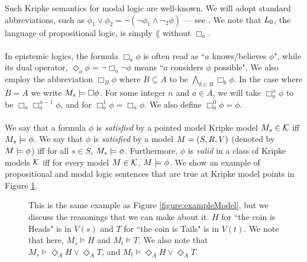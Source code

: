 Such Kripke semantics for modal logic are well-known.
We will adopt standard abbreviations, such as $\phi_1 \lor \phi_2 =
\neg(\neg \phi_1 \land \neg_2 \phi)$ --- see \cite{blackburn2002modal}.
We note that $L_0$, the language of propositional logic, is simply $\lang$ without $\Box_a$.\\
\\
In epistemic logics, the formula $\Box_a \phi$ is often read as ``$a$ knows/believes $\phi$", while
its dual operator, $\Diamond_a \phi = \neg \Box_a \neg \phi$ means ``$a$ considers $\phi$ possible".
We also employ the abbreviation $\Box_B \phi$ where $B \subseteq A$ to be $\bigwedge_{b \in B}
\Box_b \phi$.
In the case where $B = A$ we write $M_s \models \Box \phi$.
For some integer $n$ and $a \in A$, we will take $\Box^n_a \phi$ to be $\Box_a \Box^{n-1}_a \phi$,
and for $\Box^1_a \phi = \Box_a \phi$.
We also define $\Box^0_a \phi = \phi$.\\
\\
We say that a formula $\phi$ is {\em satisfied} by a pointed model Kripke model $M_s \in \mathcal{K}$ iff
$M_s \models \phi$.
We say that $\phi$ is {\em satisfied} by a model $M = (S, R, V)$ (denoted by
    $M \models \phi$) iff
for all $s \in S$, $M_s \models \phi$.
Furthermore, $\phi$ is {\em valid} in a class of Kripke models $\mathcal{K}$ iff for
every model $M \in
\mathcal{K}$, $M \models \phi$.
We show an example of propositional and modal logic sentences that are true at Kripke model points in
Figure \ref{figure:exampleReasonings}.

\begin{figure}
\centering
{}
\caption[Example reasonings at each Kripke point]{This is the same example as Figure \ref{figure:exampleModel}, but we discuss the reasonings
that we can make about it.
$H$ for ``the coin is Heads" is in $V(s)$ and $T$ for ``the coin is Tails" is in $V(t)$.
We note that here, $M_s \models H$ and $M_t \models T$.
We also note that $M_s \models \Diamond_A H \lor \Diamond_A T$, and $M_t \models \Diamond_A H \lor
\Diamond_A T$.}
\label{figure:exampleReasonings}
\end{figure}

